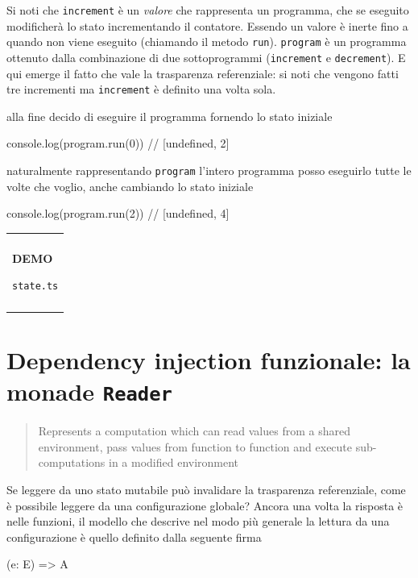 \documentclass[12pt]{article}
\theoremstyle{definition}
\newenvironment{demo}
    {\begin{center}
    \begin{tabular}{|p{0.9\textwidth}|}
    \hline\\
    }
    {
    \\\\\hline
    \end{tabular}
    \end{center}
    }
\newenvironment{code}
  {\vspace{0.5cm} \VerbatimEnvironment\begin{typescriptcode}}
  {\end{typescriptcode} \vspace{0.2cm}}
\begin{document}
Si noti che \texttt{increment} è un \emph{valore} che rappresenta un programma, che se eseguito
modificherà lo stato incrementando il contatore.
Essendo un valore è inerte fino a quando non viene eseguito (chiamando il metodo \texttt{run}).
\texttt{program} è un programma ottenuto dalla combinazione di due sottoprogrammi (\texttt{increment} e \texttt{decrement}).
E qui emerge il fatto che vale la trasparenza referenziale: si noti che vengono fatti tre incrementi
ma \texttt{increment} è definito una volta sola.

alla fine decido di eseguire il programma fornendo lo stato iniziale

\begin{code}
console.log(program.run(0)) // [undefined, 2]
\end{code}

naturalmente rappresentando \texttt{program} l'intero programma posso eseguirlo tutte le volte che voglio,
anche cambiando lo stato iniziale

\begin{code}
console.log(program.run(2)) // [undefined, 4]
\end{code}

\begin{demo}
\begin{center}
\textbf{DEMO}

\texttt{state.ts}
\end{center}
\end{demo}

\newpage

\section{Dependency injection funzionale: la monade \texttt{Reader}}

\begin{quote}
Represents a computation which can read values from a shared environment, pass values from function to function
and execute sub-computations in a modified environment
\end{quote}

Se leggere da uno stato mutabile può invalidare la trasparenza referenziale, come è possibile leggere da una configurazione globale?
Ancora una volta la risposta è nelle funzioni, il modello che descrive nel modo più generale la lettura da una configurazione
è quello definito dalla seguente firma

\begin{code}
(e: E) => A
\end{code}
\end{document}

